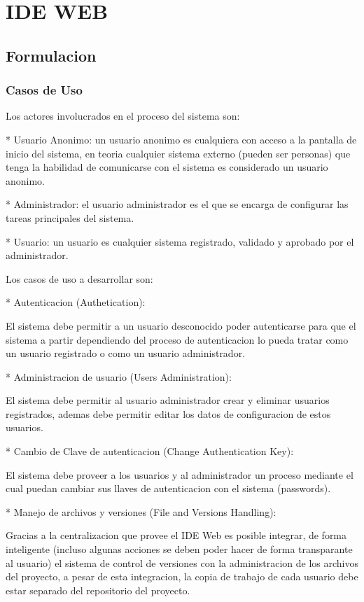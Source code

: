 \section{IDE WEB}
\subsection{Formulacion}
\subsubsection{Casos de Uso}

Los actores involucrados en el proceso del sistema son:

* Usuario Anonimo: un usuario anonimo es cualquiera con acceso a la pantalla de inicio del sistema, en teoria cualquier sistema externo (pueden ser personas) que tenga la habilidad de comunicarse con el sistema es considerado un usuario anonimo.

* Administrador: el usuario administrador es el que se encarga de configurar las tareas principales del sistema.

* Usuario: un usuario es cualquier sistema registrado, validado y aprobado por el administrador.

Los casos de uso a desarrollar son:


* Autenticacion (Authetication):

El sistema debe permitir a un usuario desconocido poder autenticarse para que el sistema a partir dependiendo del proceso de autenticacion lo pueda tratar como un usuario registrado o como un usuario administrador.

* Administracion de usuario (Users Administration):

El sistema debe permitir al usuario administrador crear y eliminar usuarios registrados, ademas debe permitir editar los datos de configuracion de estos usuarios.

* Cambio de Clave de autenticacion (Change Authentication Key):

El sistema debe proveer a los usuarios y al administrador un proceso mediante el cual puedan cambiar sus llaves de autenticacion con el sistema (passwords).


* Manejo de archivos y versiones (File and Versions Handling):

Gracias a la centralizacion que provee el IDE Web es posible integrar, de forma inteligente (incluso algunas acciones se deben poder hacer de forma transparante al usuario) el sistema de control de versiones con la administracion de los archivos del proyecto, a pesar de esta integracion, la copia de trabajo de cada usuario debe estar separado del repositorio del proyecto.

